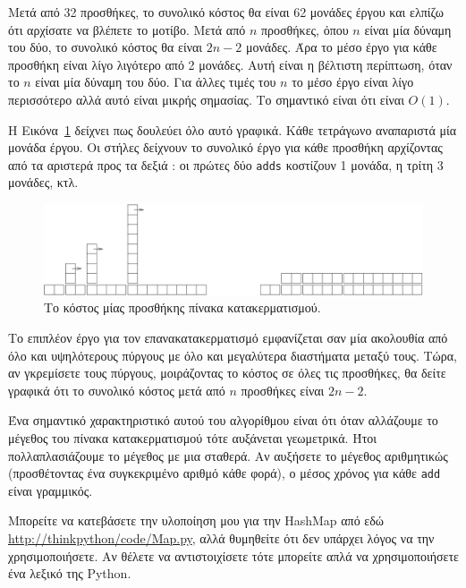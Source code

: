 \documentclass[10pt]{book}
\begin{document}
Μετά από 32 προσθήκες, το συνολικό κόστος θα είναι 62 μονάδες έργου και ελπίζω ότι αρχίσατε να βλέπετε το μοτίβο.  Μετά από $n$ προσθήκες, όπου $n$ είναι μία δύναμη του δύο, το συνολικό κόστος θα είναι $2n-2$ μονάδες.  Άρα το μέσο έργο για 
κάθε προσθήκη είναι λίγο λιγότερο από 2 μονάδες. Αυτή είναι η βέλτιστη περίπτωση, όταν το $n$ είναι μία δύναμη του δύο.  Για άλλες τιμές του $n$ το μέσο έργο είναι λίγο περισσότερο αλλά αυτό είναι μικρής σημασίας.  Το σημαντικό είναι ότι είναι 
$O(1)$.

Η Εικόνα~\ref{fig.hash} δείχνει πως δουλεύει όλο αυτό γραφικά.  Κάθε τετράγωνο αναπαριστά μία μονάδα έργου.  Οι στήλες δείχνουν το συνολικό έργο για 
κάθε προσθήκη αρχίζοντας από τα αριστερά προς τα δεξιά :  οι πρώτες δύο  
{\tt adds}  κοστίζουν 1 μονάδα, η τρίτη 3 μονάδες, κτλ. 

\begin{figure}
\centerline{\includegraphics[scale=1.0]{figs/towers.pdf}}
\caption{Το κόστος μίας προσθήκης πίνακα κατακερματισμού.} 
\label{fig.hash}
\end{figure}

 Το επιπλέον έργο για τον επανακατακερματισμό εμφανίζεται σαν μία ακολουθία 
από όλο και υψηλότερους πύργους με όλο και μεγαλύτερα διαστήματα μεταξύ τους.  Τώρα, αν γκρεμίσετε τους πύργους, μοιράζοντας το κόστος σε όλες τις προσθήκες, θα δείτε γραφικά ότι το συνολικό κόστος μετά από $n$ προσθήκες είναι $2n - 2$.

Ένα σημαντικό χαρακτηριστικό αυτού του αλγορίθμου είναι ότι όταν αλλάζουμε το μέγεθος του πίνακα κατακερματισμού τότε αυξάνεται γεωμετρικά. Ήτοι πολλαπλασιάζουμε το μέγεθος με μια σταθερά.  Αν αυξήσετε το μέγεθος αριθμητικώς (προσθέτοντας ένα συγκεκριμένο αριθμό κάθε φορά), ο μέσος χρόνος για κάθε  {\tt add}  είναι γραμμικός.

Μπορείτε να κατεβάσετε την υλοποίηση μου για την  HashMap  από εδώ  
\url{http://thinkpython/code/Map.py},  αλλά θυμηθείτε ότι δεν υπάρχει λόγος να την χρησιμοποιήσετε. Αν θέλετε να αντιστοιχίσετε τότε μπορείτε απλά να χρησιμοποιήσετε ένα λεξικό της  Python.
\end{document}
